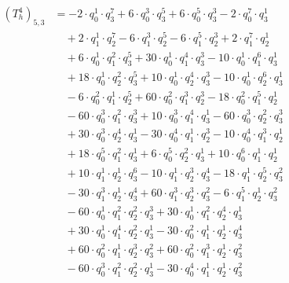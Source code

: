 \begin{align*}(T_{h}^4)_{5,3}&=-2\cdot q_0^{1}\cdot q_3^{7}+6\cdot q_0^{3}\cdot q_3^{5}+6\cdot q_0^{5}\cdot q_3^{3}-2\cdot q_0^{7}\cdot q_3^{1}\\
&\quad +2\cdot q_1^{1}\cdot q_2^{7}-6\cdot q_1^{3}\cdot q_2^{5}-6\cdot q_1^{5}\cdot q_2^{3}+2\cdot q_1^{7}\cdot q_2^{1}\\
&\quad +6\cdot q_0^{1}\cdot q_1^{2}\cdot q_3^{5}+30\cdot q_0^{1}\cdot q_1^{4}\cdot q_3^{3}-10\cdot q_0^{1}\cdot q_1^{6}\cdot q_3^{1}\\
&\quad +18\cdot q_0^{1}\cdot q_2^{2}\cdot q_3^{5}+10\cdot q_0^{1}\cdot q_2^{4}\cdot q_3^{3}-10\cdot q_0^{1}\cdot q_2^{6}\cdot q_3^{1}\\
&\quad -6\cdot q_0^{2}\cdot q_1^{1}\cdot q_2^{5}+60\cdot q_0^{2}\cdot q_1^{3}\cdot q_2^{3}-18\cdot q_0^{2}\cdot q_1^{5}\cdot q_2^{1}\\
&\quad -60\cdot q_0^{3}\cdot q_1^{2}\cdot q_3^{3}+10\cdot q_0^{3}\cdot q_1^{4}\cdot q_3^{1}-60\cdot q_0^{3}\cdot q_2^{2}\cdot q_3^{3}\\
&\quad +30\cdot q_0^{3}\cdot q_2^{4}\cdot q_3^{1}-30\cdot q_0^{4}\cdot q_1^{1}\cdot q_2^{3}-10\cdot q_0^{4}\cdot q_1^{3}\cdot q_2^{1}\\
&\quad +18\cdot q_0^{5}\cdot q_1^{2}\cdot q_3^{1}+6\cdot q_0^{5}\cdot q_2^{2}\cdot q_3^{1}+10\cdot q_0^{6}\cdot q_1^{1}\cdot q_2^{1}\\
&\quad +10\cdot q_1^{1}\cdot q_2^{1}\cdot q_3^{6}-10\cdot q_1^{1}\cdot q_2^{3}\cdot q_3^{4}-18\cdot q_1^{1}\cdot q_2^{5}\cdot q_3^{2}\\
&\quad -30\cdot q_1^{3}\cdot q_2^{1}\cdot q_3^{4}+60\cdot q_1^{3}\cdot q_2^{3}\cdot q_3^{2}-6\cdot q_1^{5}\cdot q_2^{1}\cdot q_3^{2}\\
&\quad -60\cdot q_0^{1}\cdot q_1^{2}\cdot q_2^{2}\cdot q_3^{3}+30\cdot q_0^{1}\cdot q_1^{2}\cdot q_2^{4}\cdot q_3^{1}\\
&\quad +30\cdot q_0^{1}\cdot q_1^{4}\cdot q_2^{2}\cdot q_3^{1}-30\cdot q_0^{2}\cdot q_1^{1}\cdot q_2^{1}\cdot q_3^{4}\\
&\quad +60\cdot q_0^{2}\cdot q_1^{1}\cdot q_2^{3}\cdot q_3^{2}+60\cdot q_0^{2}\cdot q_1^{3}\cdot q_2^{1}\cdot q_3^{2}\\
&\quad -60\cdot q_0^{3}\cdot q_1^{2}\cdot q_2^{2}\cdot q_3^{1}-30\cdot q_0^{4}\cdot q_1^{1}\cdot q_2^{1}\cdot q_3^{2}\end{align*}
